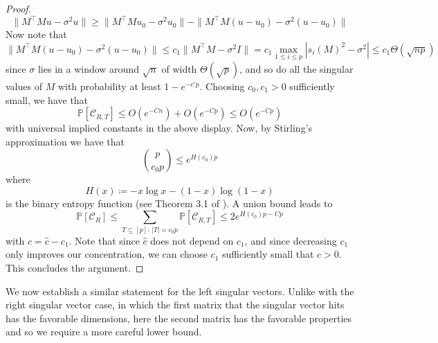 \documentclass[11pt]{article}
\numberwithin{equation}{section}
\theoremstyle{remark}
\begin{document}
\begin{proof}
    \begin{equation*}
        \|M^\top M u - \sigma^2 u\| \geq \|M^\top M u_0 - \sigma^2 u_0\| - \|M^\top M (u - u_0) - \sigma^2 (u - u_0)\| 
    \end{equation*}
    Now note that
    \begin{equation*}
        \|M^\top M (u - u_0) - \sigma^2 (u - u_0)\|  \leq c_1 \|M^\top M - \sigma^2I\| = c_1 \max_{1 \leq i \leq p}|s_i(M)^2 - \sigma^2| \leq c_1 \Theta(\sqrt{np})
    \end{equation*}
    since $\sigma$ lies in a window around $\sqrt{n}$ of width $\Theta(\sqrt{p})$, and so do all the singular values of $M$ with probability at least $1 - e^{-c'p}$. Choosing $c_0, c_1 > 0$ sufficiently small, we have that 
    \begin{equation*}
        \mathbb{P}[\mathcal{C}_{R,T}] \leq O(e^{-Cn}) + O(e^{-Cp}) \leq O(e^{-Cp})
    \end{equation*}
    with universal implied constants in the above display. Now, by Stirling's approximation we have that 
    \begin{equation*}
        \binom{p}{c_0 p} \leq e^{H(c_0)p}
    \end{equation*}
    where
    \begin{equation*}
        H(x) \coloneqq -x\log x - (1 - x)\log (1 - x)
    \end{equation*}
    is the binary entropy function (see Theorem 3.1 of \cite{galvin2014three}). A union bound leads to
    \begin{equation*}
        \mathbb{P}[\mathcal{C}_R] \leq \sum_{T \subseteq [p]: \, |T| = c_0 p}\mathbb{P}[\mathcal{C}_{R, T}] \leq 2e^{H(c_0)p - Cp}
    \end{equation*}
     with $c = \hat{c} - c_1$. Note that since $\hat{c}$ does not depend on $c_1$, and since decreasing $c_1$ only improves our concentration, we can choose $c_1$ sufficiently small that $c > 0$. This concludes the argument.
\end{proof}

We now establish a similar statement for the left singular vectors. Unlike with the right singular vector case, in which the first matrix that the singular vector hits has the favorable dimensions, here the second matrix has the favorable properties and so we require a more careful lower bound.
\end{document}
